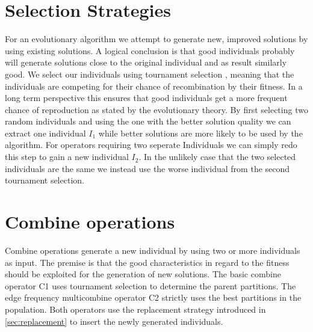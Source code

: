 \documentclass[a4paper,12pt,bibtotoc,titlepage, liststotoc,BCOR7mm,headsepline,pointlessnumbers]{scrbook}
\numberwithin{equation}{section}
\begin{document}
\section{Selection Strategies}
For an evolutionary algorithm we attempt to generate new, improved solutions by using existing solutions. A logical conclusion is that good individuals probably will generate solutions
close to the original individual and as result similarly good. We select our individuals using tournament selection \cite{blickle1996comparison}, meaning that the individuals are competing for their chance of recombination by their fitness. In a long term perspective this ensures that good individuals get a more frequent chance of reproduction as stated by the evolutionary theory.  By first selecting two random individuals and using the one with the better solution quality we can extract one individual $I_1$ while better solutions are more likely to be used by the algorithm. For operators requiring two seperate Individuals we can simply redo this step to gain a new individual $I_2$. In the unlikely case that the two selected individuals are the same we instead use the worse individual from the second tournament selection.
\section{Combine operations}
Combine operations generate a new individual by using two or more individuals as input. The premise is that the good characteristics in regard to the fitness should be exploited for the 
generation of new solutions. The basic combine operator C1 uses tournament selection to determine the parent partitions. The edge frequency multicombine operator C2 strictly uses the best
partitions in the population. Both operators use the replacement strategy introduced in \ref{sec:replacement} to insert the newly generated individuals.
\end{document}

